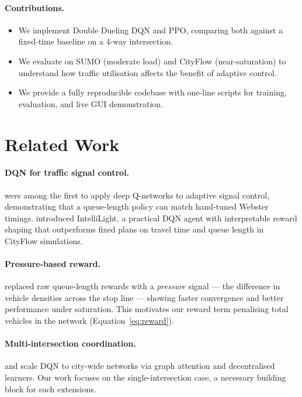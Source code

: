 \documentclass[twoside,11pt]{article}
\begin{document}
\paragraph{Contributions.}
\begin{itemize}
  \item We implement Double Dueling DQN and PPO, comparing both against a
        fixed-time baseline on a 4-way intersection.
  \item We evaluate on SUMO (moderate load) and CityFlow (near-saturation) to
        understand how traffic utilisation affects the benefit of adaptive control.
  \item We provide a fully reproducible codebase with one-line scripts for
        training, evaluation, and live GUI demonstration.
\end{itemize}

\section{Related Work}

\paragraph{DQN for traffic signal control.}
\citet{li2016traffic} were among the first to apply deep Q-networks to adaptive
signal control, demonstrating that a queue-length policy can match hand-tuned
Webster timings.  \citet{wei2018intellilight} introduced IntelliLight, a
practical DQN agent with interpretable reward shaping that outperforms fixed
plans on travel time and queue length in CityFlow simulations.

\paragraph{Pressure-based reward.}
\citet{wei2019presslight} replaced raw queue-length rewards with a
\emph{pressure} signal — the difference in vehicle densities across the stop
line — showing faster convergence and better performance under saturation.
This motivates our reward term penalising total vehicles in the network
(Equation~\ref{eq:reward}).

\paragraph{Multi-intersection coordination.}
\citet{wei2019colight} and \citet{chen2020toward} scale DQN to city-wide
networks via graph attention and decentralised learners.  Our work focuses on
the single-intersection case, a necessary building block for such extensions.
\end{document}
